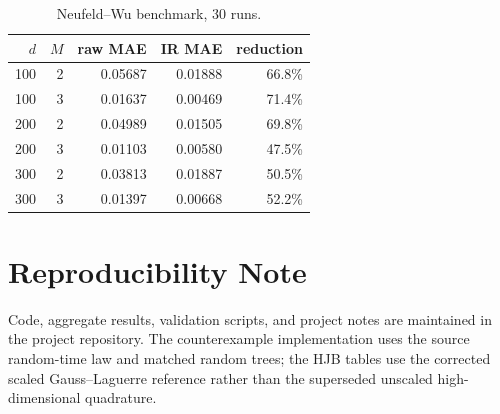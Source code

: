 \begin{table}[h]
\caption{Neufeld--Wu benchmark, 30 runs.}
\centering\small
\begin{tabular}{rrrrr}
\toprule
$d$&$M$&raw MAE&IR MAE&reduction\\
\midrule
100&2&0.05687&0.01888&66.8\%\\
100&3&0.01637&0.00469&71.4\%\\
200&2&0.04989&0.01505&69.8\%\\
200&3&0.01103&0.00580&47.5\%\\
300&2&0.03813&0.01887&50.5\%\\
300&3&0.01397&0.00668&52.2\%\\
\bottomrule
\end{tabular}
\end{table}

\section{Reproducibility Note}
Code, aggregate results, validation scripts, and project notes are maintained in the project repository. The counterexample implementation uses the source random-time law and matched random trees; the HJB tables use the corrected scaled Gauss--Laguerre reference rather than the superseded unscaled high-dimensional quadrature.


